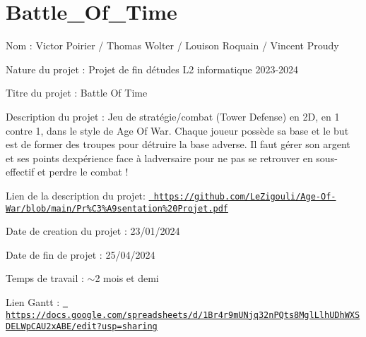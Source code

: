 \chapter{Battle\+\_\+\+Of\+\_\+\+Time}
\hypertarget{md__2_users_2vic_2_documents_2_battle___of___time_2_r_e_a_d_m_e}{}\label{md__2_users_2vic_2_documents_2_battle___of___time_2_r_e_a_d_m_e}
\label{md__2_users_2vic_2_documents_2_battle___of___time_2_r_e_a_d_m_e_autotoc_md0}%
%
 Nom \+: Victor Poirier / Thomas Wolter / Louison Roquain / Vincent Proudy

Nature du projet \+: Projet de fin d\textquotesingle{}études L2 informatique 2023-\/2024

Titre du projet \+: Battle Of Time

Description du projet \+: Jeu de stratégie/combat (Tower Defense) en 2D, en 1 contre 1, dans le style de Age Of War. Chaque joueur possède sa base et le but est de former des troupes pour détruire la base adverse. Il faut gérer son argent et ses points d\textquotesingle{}expérience face à l\textquotesingle{}adversaire pour ne pas se retrouver en sous-\/effectif et perdre le combat !

Lien de la description du projet\+: \href{https://github.com/LeZigouli/Age-Of-War/blob/main/Pr\%C3\%A9sentation\%20Projet.pdf}{\texttt{ https\+://github.\+com/\+Le\+Zigouli/\+Age-\/\+Of-\/\+War/blob/main/\+Pr\%\+C3\%\+A9sentation\%20\+Projet.\+pdf}}

Date de creation du projet \+: 23/01/2024

Date de fin de projet \+: 25/04/2024

Temps de travail \+: \texorpdfstring{$\sim$}{\string~}2 mois et demi

Lien Gantt \+: \href{https://docs.google.com/spreadsheets/d/1Br4r9mUNjq32nPQts8MglLlhUDhWXSDELWpCAU2xABE/edit?usp=sharing}{\texttt{ https\+://docs.\+google.\+com/spreadsheets/d/1\+Br4r9m\+UNjq32n\+PQts8\+Mgl\+Llh\+UDh\+WXSDELWp\+CAU2x\+ABE/edit?usp=sharing}} 